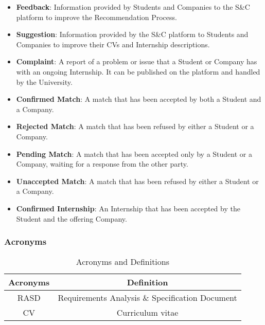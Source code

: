 \begin{itemize}
    \item \textcolor{titleColor}{\textbf{Feedback}\label{def:Feedback}}: Information provided by Students and Companies to the S\&C platform to improve the Recommendation Process.
    \item \textcolor{titleColor}{\textbf{Suggestion}\label{def:suggestion}}: Information provided by the S\&C platform to Students and Companies to improve their CVs and Internship descriptions.
    \item \textcolor{titleColor}{\textbf{Complaint}\label{def:complaint}}: A report of a problem or issue that a Student or Company has with an ongoing Internship. It can be published on the platform and handled by the University.
    \item \textcolor{titleColor}{\textbf{Confirmed Match}\label{def:confirmedMatch}}: A match that has been accepted by both a Student and a Company.
    \item \textcolor{titleColor}{\textbf{Rejected Match}\label{def:rejectedMatch}}: A match that has been refused by either a Student or a Company.
    \item \textcolor{titleColor}{\textbf{Pending Match}\label{def:pendingMatch}}: A match that has been accepted only by a Student or a Company, waiting for a response from the other party.
    \item \textcolor{titleColor}{\textbf{Unaccepted Match}\label{def:unacceptedMatch}}: A match that has been refused by either a Student or a Company.
    \item \textcolor{titleColor}{\textbf{Confirmed Internship}\label{def:confirmdInternship}}: An Internship that has been accepted by the Student and the offering Company.
    
    
    
\end{itemize}

\subsubsection{Acronyms}
\begin{table}[h]
    \centering
\begin{tabular}{|c|c|}
        \hline
        \textbf{Acronyms} & \textbf{Definition} \\ \hline
        RASD & Requirements Analysis \& Specification Document\\ \hline
        CV & Curriculum vitae\\ \hline
    \end{tabular}
    \caption{Acronyms and Definitions}
    \label{tab:acronyms}
\end{table}


